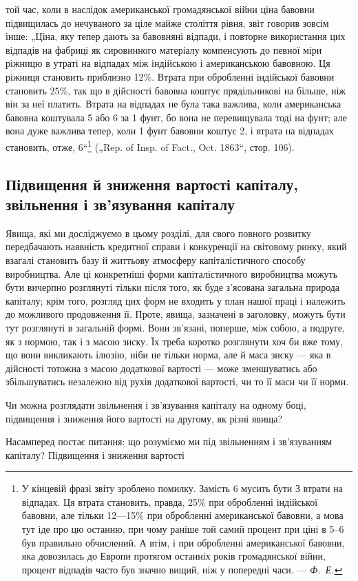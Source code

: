 \parcont{}  %
той час, коли в наслідок американської громадянської війни ціна
бавовни підвищилась до нечуваного за ціле майже століття
рівня, звіт говорив зовсім інше: „Ціна, яку тепер дають за бавовняні
відпади, і повторне використання цих відпадів на
фабриці як сировинного матеріалу компенсують до певної міри
ріжницю в утраті на відпадах між індійською і американською
бавовною. Ця ріжниця становить приблизно 12\%. Втрата при
обробленні індійської бавовни становить 25\%, так що в дійсності
бавовна коштує прядільникові на  більше, ніж він за неї
платить. Втрата на відпадах не була така важлива, коли американська
бавовна коштувала 5 або 6 за 1 фунт, бо вона
не перевищувала тоді  на фунт; але вона дуже важлива
тепер, коли 1 фунт бавовни коштує 2, і втрата на відпадах
становить, отже, 6“\footnote{
У кінцевій фразі звіту зроблено помилку. Замість 6 мусить бути З
втрати на відпадах. Ця втрата становить, правда, 25\% при обробленні
індійської бавовни, але тільки 12—15\% при обробленні американської бавовни,
а мова тут іде про цю останню, при чому раніше той самий процент при
ціні в 5--6 був правильно обчислений. А втім, і при обробленні американської
бавовни, яка довозилась до Европи протягом останніх років громадянської
війни, процент відпадів часто був значно вищий, ніж у попередні
часи. — \emph{Ф.~Е.}
} („Rep. of Insp. of Fact., Oct.
1863“, стор. 106).

\subsection{Підвищення й зниження вартості капіталу, звільнення
і зв’язування капіталу}

Явища, які ми досліджуємо в цьому розділі, для свого повного
розвитку передбачають наявність кредитної справи і конкуренції
на світовому ринку, який взагалі становить базу й життьову атмосферу
капіталістичного способу виробництва. Але ці конкретніші
форми капіталістичного виробництва можуть бути вичерпно розглянуті
тільки після того, як буде з’ясована загальна природа
капіталу; крім того, розгляд цих форм не входить у план нашої
праці і належить до можливого продовження її. Проте, явища,
зазначені в заголовку, можуть бути тут розглянуті в загальній
формі. Вони зв’язані, поперше, між собою, а подруге, як
з нормою, так і з масою зиску. Їх треба коротко розглянути
хоч би вже тому, що вони викликають ілюзію, ніби не тільки
норма, але й маса зиску — яка в дійсності тотожна з масою
додаткової вартості — може зменшуватись або збільшуватись
незалежно від рухів додаткової вартості, чи то її маси чи її
норми.

Чи можна розглядати звільнення і зв’язування капіталу на
одному боці, підвищення і зниження його вартості на другому,
як різні явища?

Насамперед постає питання: що розуміємо ми під звільненням
і зв’язуванням капіталу? Підвищення і зниження вартості
\parbreak{}  %
